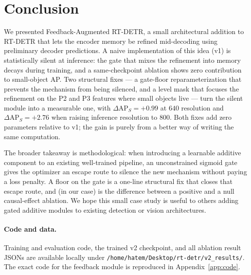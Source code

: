 \section{Conclusion}
\label{sec:conclusion}

We presented Feedback-Augmented RT-DETR, a small architectural addition to RT-DETR that lets the encoder memory be refined mid-decoding using preliminary decoder predictions. A naive implementation of this idea (v1) is statistically silent at inference: the gate that mixes the refinement into memory decays during training, and a same-checkpoint ablation shows zero contribution to small-object AP. Two structural fixes --- a gate-floor reparameterization that prevents the mechanism from being silenced, and a level mask that focuses the refinement on the P2 and P3 features where small objects live --- turn the silent module into a measurable one, with $\Delta\mathrm{AP}_S = +0.99$ at $640$ resolution and $\Delta\mathrm{AP}_S = +2.76$ when raising inference resolution to $800$. Both fixes add zero parameters relative to v1; the gain is purely from a better way of writing the same computation.

The broader takeaway is methodological: when introducing a learnable additive component to an existing well-trained pipeline, an unconstrained sigmoid gate gives the optimizer an escape route to silence the new mechanism without paying a loss penalty. A floor on the gate is a one-line structural fix that closes that escape route, and (in our case) is the difference between a positive and a null causal-effect ablation. We hope this small case study is useful to others adding gated additive modules to existing detection or vision architectures.

\paragraph{Code and data.} Training and evaluation code, the trained v2 checkpoint, and all ablation result JSONs are available locally under \texttt{/home/hatem/Desktop/rt-detr/v2\_results/}. The exact code for the feedback module is reproduced in Appendix~\ref{app:code}.
